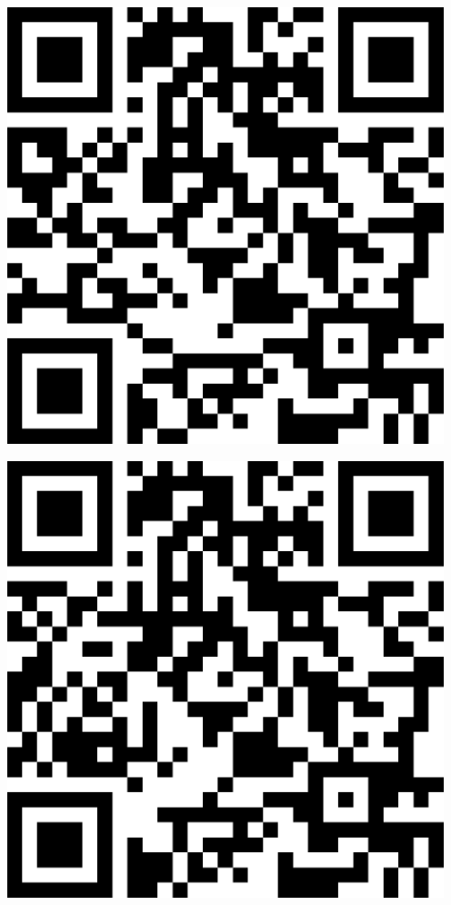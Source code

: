 \documentclass[letterpaper]{article}
\begin{document}
 \endgroup 
 \vspace*{\fill} 
 \pagebreak 
{} 
 \vspace*{\fill} 
 \begingroup 
 \centerline{\includegraphics[scale=1,width=5in,height=5in]{Office3635.png}} 
 \endgroup 
 \vspace*{\fill} 
 \pagebreak 
{} 
 \vspace*{\fill} 
 \begingroup 
 \centerline{\includegraphics[scale=1,width=5in,height=5in]{Office3637.png}} 
\end{document}
